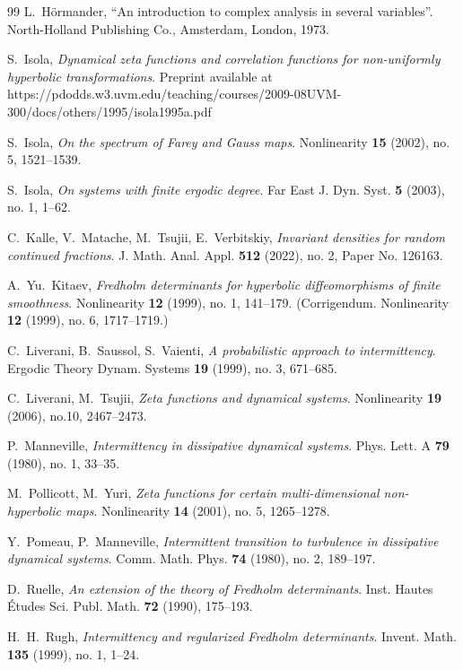 \documentclass[11pt]{amsart}
\theoremstyle{definition}
\theoremstyle{remark}
\theoremstyle{definition}
\numberwithin{equation}{section}
\begin{document}
\begin{thebibliography}{99}
 L.~H\"ormander, ``An introduction to complex analysis in several variables''. North-Holland Publishing Co., Amsterdam, London, 1973.

 S.~Isola, \emph{Dynamical zeta functions and correlation functions for non-uniformly hyperbolic transformations}. Preprint available at https://pdodds.w3.uvm.edu/teaching/courses/2009-08UVM-300/docs/others/1995/isola1995a.pdf

 S.~Isola, \emph{On the spectrum of Farey and Gauss maps}. Nonlinearity {\bf 15} (2002), no. 5, 1521--1539.

 S.~Isola, \emph{On systems with finite ergodic degree}. Far East J. Dyn. Syst. {\bf 5} (2003), no. 1, 1--62.

 C.~Kalle, V.~Matache, M.~Tsujii, E.~Verbitskiy, \emph{Invariant densities for random continued fractions}. J. Math. Anal. Appl. {\bf 512} (2022), no. 2, Paper No. 126163.

  A.~Yu.~Kitaev, \emph{Fredholm determinants for hyperbolic diffeomorphisms of finite smoothness}. Nonlinearity \textbf{12} (1999), no. 1, 141--179. (Corrigendum. Nonlinearity \textbf{12} (1999), no. 6, 1717--1719.)

 C.~Liverani, B.~Saussol, S.~Vaienti, \emph{A probabilistic approach to intermittency}. Ergodic Theory Dynam. Systems \textbf{19} (1999), no. 3, 671--685.

 C.~Liverani, M.~Tsujii, \emph{Zeta functions and dynamical systems}. Nonlinearity \textbf{19} (2006), no.10, 2467--2473.

 P.~Manneville, \emph{Intermittency in dissipative dynamical systems}. Phys. Lett. A \textbf{79} (1980), no. 1, 33--35.

 M.~Pollicott, M.~Yuri, \emph{Zeta functions for certain multi-dimensional non-hyperbolic maps}. Nonlinearity \textbf{14} (2001), no. 5, 1265--1278.

 Y.~Pomeau, P.~Manneville, \emph{Intermittent transition to turbulence in dissipative dynamical systems}. Comm. Math. Phys. \textbf{74} (1980), no. 2, 189--197.


 D.~Ruelle, \emph{An extension of the theory of Fredholm determinants}. Inst. Hautes \'Etudes Sci. Publ. Math. \textbf{72} (1990), 175--193.

 H.~H.~Rugh, \emph{Intermittency and regularized Fredholm determinants}. Invent. Math. {\bf 135} (1999), no. 1, 1--24.

\end{thebibliography}
\end{document}
